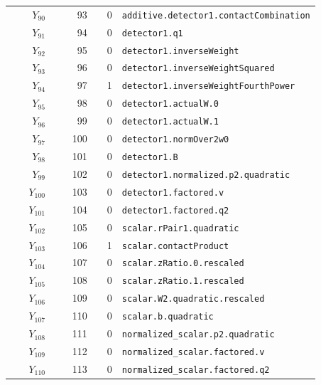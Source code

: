 {\begin{longtable}{@{}r r r p{0.64\linewidth}@{}}
\(Y_{90}\) & 93 & 0 & \texttt{additive.\allowbreak{}detector1.\allowbreak{}contactCombination} \\
\(Y_{91}\) & 94 & 0 & \texttt{detector1.\allowbreak{}q1} \\
\(Y_{92}\) & 95 & 0 & \texttt{detector1.\allowbreak{}inverseWeight} \\
\(Y_{93}\) & 96 & 0 & \texttt{detector1.\allowbreak{}inverseWeightSquared} \\
\(Y_{94}\) & 97 & 1 & \texttt{detector1.\allowbreak{}inverseWeightFourthPower} \\
\(Y_{95}\) & 98 & 0 & \texttt{detector1.\allowbreak{}actualW.\allowbreak{}0} \\
\(Y_{96}\) & 99 & 0 & \texttt{detector1.\allowbreak{}actualW.\allowbreak{}1} \\
\(Y_{97}\) & 100 & 0 & \texttt{detector1.\allowbreak{}normOver2w0} \\
\(Y_{98}\) & 101 & 0 & \texttt{detector1.\allowbreak{}B} \\
\(Y_{99}\) & 102 & 0 & \texttt{detector1.\allowbreak{}normalized.\allowbreak{}p2.\allowbreak{}quadratic} \\
\(Y_{100}\) & 103 & 0 & \texttt{detector1.\allowbreak{}factored.\allowbreak{}v} \\
\(Y_{101}\) & 104 & 0 & \texttt{detector1.\allowbreak{}factored.\allowbreak{}q2} \\
\(Y_{102}\) & 105 & 0 & \texttt{scalar.\allowbreak{}rPair1.\allowbreak{}quadratic} \\
\(Y_{103}\) & 106 & 1 & \texttt{scalar.\allowbreak{}contactProduct} \\
\(Y_{104}\) & 107 & 0 & \texttt{scalar.\allowbreak{}zRatio.\allowbreak{}0.\allowbreak{}rescaled} \\
\(Y_{105}\) & 108 & 0 & \texttt{scalar.\allowbreak{}zRatio.\allowbreak{}1.\allowbreak{}rescaled} \\
\(Y_{106}\) & 109 & 0 & \texttt{scalar.\allowbreak{}W2.\allowbreak{}quadratic.\allowbreak{}rescaled} \\
\(Y_{107}\) & 110 & 0 & \texttt{scalar.\allowbreak{}b.\allowbreak{}quadratic} \\
\(Y_{108}\) & 111 & 0 & \texttt{normalized\_scalar.\allowbreak{}p2.\allowbreak{}quadratic} \\
\(Y_{109}\) & 112 & 0 & \texttt{normalized\_scalar.\allowbreak{}factored.\allowbreak{}v} \\
\(Y_{110}\) & 113 & 0 & \texttt{normalized\_scalar.\allowbreak{}factored.\allowbreak{}q2} \\

\end{longtable}}
